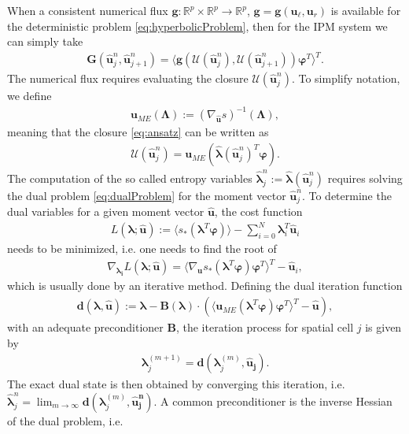 When a consistent numerical flux $\bm g:\mathbb{R}^p\times\mathbb{R}^p\to\mathbb{R}^p$, $\bm g = \bm g(\bm u_\ell, \bm u_r)$ is available for the deterministic problem \eqref{eq:hyperbolicProblem}, then for the IPM system we can simply take
\begin{align*}
 \bm{G}(\bm{\hat u}_{j}^n,\bm{\hat u}_{j+1}^{n}) = \langle \bm g(\mathcal{U}(\bm{\hat u}_j^n),\mathcal{U}(\bm{\hat u}_{j+1}^n))\bm{\varphi}^T\rangle^T.
\end{align*}
The numerical flux requires evaluating the closure $\mathcal{U}(\bm{\hat u}_j^n)$. To simplify notation, we define
\begin{align*}
\bm{u}_{ME}(\bm\Lambda):=\left( \nabla_{\bm{\hat u}} s \right)^{-1}(\bm\Lambda),
\end{align*}
meaning that the closure \eqref{eq:ansatz} can be written as
\begin{align*}
\mathcal{U}(\bm{\hat u}_j^n) = \bm{u}_{ME}(\bm{\hat{\lambda}}(\bm{\hat u}_j^n)^T \bm{\varphi}).
\end{align*}
The computation of the so called entropy variables $\bm{\hat\lambda}_j^n:=\bm{\hat\lambda}(\bm{\hat u}_j^n)$ requires solving the dual problem \eqref{eq:dualProblem} for the moment vector $\bm{\hat u}_{j}^{n}$. To determine the dual variables for a given moment vector $\bm{\hat{u}}$, the cost function
\begin{align*}
L(\bm{\lambda};\bm{\hat{u}}) := \langle s_*(\bm{\lambda}^T \bm\varphi)\rangle - \sum_{i=0}^{N}\bm{\lambda}_i^T \bm{\hat u}_i
\end{align*}
needs to be minimized, i.e. one needs to find the root of
\begin{align*}
\nabla_{\bm{\lambda_i}}L(\bm{\lambda};\bm{\hat{u}}) = \langle \nabla_{\bm{u}}s_*(\bm{\lambda}^T \bm\varphi)\bm\varphi^T\rangle^T - \bm{\hat u}_i,
\end{align*}
which is usually done by an iterative method. Defining the dual iteration function
\begin{align*}
\bm{d}(\bm{\lambda},\bm{\hat{u}}):= \bm{\lambda}-\bm{B}(\bm{\lambda})\cdot \left(\langle \bm u_{ME}(\bm{\lambda}^T\bm{\varphi})\bm{\varphi}^T\rangle^T-\bm{\hat{u}}\right),
\end{align*}
with an adequate preconditioner $\bm{B}$, the iteration process for spatial cell $j$ is given by
\begin{align}\label{eq:dualIteration1}
\bm{\lambda}^{(m+1)}_j = \bm{d}(\bm{\lambda}_j^{(m)},\bm{\hat{u}_j}).
\end{align}
The exact dual state is then obtained by converging this iteration, i.e. $\bm{\hat\lambda}_j^n=\lim_{m\rightarrow\infty}\bm{d}(\bm{\lambda}_j^{(m)},\bm{\hat{u}_j^n})$. A common preconditioner is the inverse Hessian of the dual problem, i.e.
